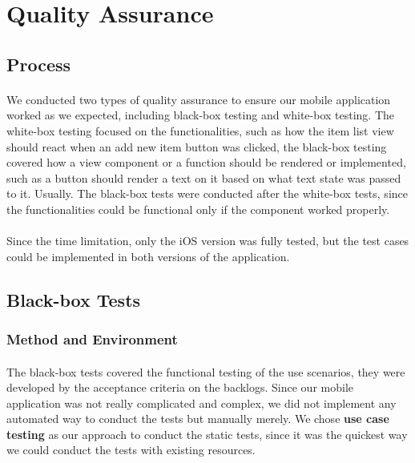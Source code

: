 \documentclass[12pt,a4paper]{article}
\begin{document}
    \section{Quality Assurance} %
      \label{chapter:Quality Assurance}
      
      \subsection{Process} %
        \paragraph{} We conducted two types of quality assurance to ensure our mobile application worked as we expected, including black-box testing and white-box testing. The white-box testing focused on the functionalities, such as how the item list view should react when an add new item button was clicked, the black-box testing covered how a view component or a function should be rendered or implemented, such as a button should render a text on it based on what text state was passed to it. Usually. The black-box tests were conducted after the white-box tests, since the functionalities could be functional only if the component worked properly. 

        \paragraph{} Since the time limitation, only the iOS version was fully tested, but the test cases could be implemented in both versions of the application.

      \subsection{Black-box Tests}
        \subsubsection{Method and Environment} %
          \paragraph{} The black-box tests covered the functional testing of the use scenarios, they were developed by the acceptance criteria on the backlogs. Since our mobile application was not really complicated and complex, we did not implement any automated way to conduct the tests but manually merely. We chose {\bf use case testing} as our approach to conduct the static tests, since it was the quickest way we could conduct the tests with existing resources.
          
\end{document}
